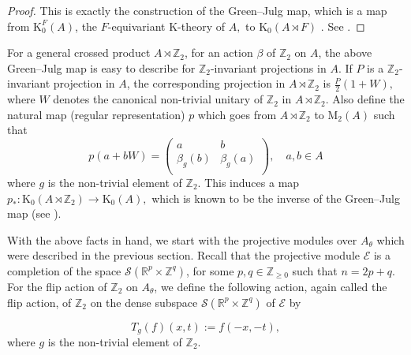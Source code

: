 \documentclass[9pt, BCOR=2mm]{amsart}
\numberwithin{equation}{section}
\numberwithin{equation}{section}
\newcommand{\Z}{{\mathbb{Z}}}
\newcommand{\R}{{\mathbb{R}}}
\newcommand{\K}{\mathrm{K}} %
\newcommand{\M}{\mathrm{M}}
\newcommand{\Ne}{{\mathbb{Z}}_{\ge 0}}
\begin{document}
\begin{proof}
	This is exactly the construction of the Green--Julg map, which is a map from $\K_0^F(A)$, the $F$-equivariant K-theory of $A,$ to $\K_0(A\rtimes F)$ . See \cite[Proposition 4.5]{ELPW10}.
\end{proof} 

For a general crossed product $A \rtimes \Z_2$, for an action $\beta$ of $\Z_2$ on $A$, the above Green--Julg map is easy to describe for $\Z_2$-invariant projections in $A$. If $P$ is a $\Z_2$-invariant projection in $A$, the corresponding projection in $A \rtimes \Z_2$ is $\frac{P}{2}(1+W),$ where $W$ denotes the canonical non-trivial unitary of $\Z_2$ in $A \rtimes \Z_2.$
Also define the natural map (regular representation) $p$ which goes from $A \rtimes \Z_2$ to $\M_2(A)$  such that 
\begin{equation}\label{eq:def_of_p}
	 p(a + bW) = \left( \begin{array}{ccc}
a & b\\
\beta_g(b) & \beta_g(a)\\
  \end{array} \right),\quad a,b\in A\end{equation} where $g$ is the non-trivial element of $\Z_2.$ This induces a map $p_*: \K_0(A \rtimes \Z_2) \rightarrow \K_0(A),$ which is known to be the inverse of the Green--Julg map (see \cite[page 191]{HG04}).
  
  With the above facts in hand, we start with the projective modules over $A_\theta$ which were described in the previous section. Recall that the projective module $\mathcal{E}$ is a completion of the space  $\mathscr{S}(\R^p \times \Z^q)$, for some  $p, q \in \Ne$ such that  $n=2p + q$. For the flip action of $\Z_2$ on $A_\theta$, we define the following action, again called the flip action, of $\Z_2$ on the dense subspace $\mathscr{S}(\R^p \times \Z^q)$ of $\mathcal{E}$ by 
  

  \begin{equation}\label{eq:flip_action_module}
	T_g (f)(x,t):= f(-x,-t),
	\end{equation}
	where $g$ is the non-trivial element of $\Z_2.$ 
	
\end{document}
